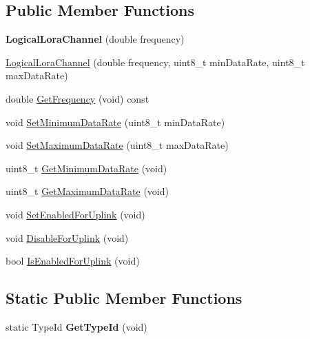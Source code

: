 \subsection*{Public Member Functions}
\begin{DoxyCompactItemize}
\item 
\mbox{\label{classns3_1_1lorawan_1_1LogicalLoraChannel_af4804eb74b0d9e6b12a9321172d9296f}} 
{\bfseries Logical\+Lora\+Channel} (double frequency)
\item 
\hyperlink{classns3_1_1lorawan_1_1LogicalLoraChannel_a686e1cf42931f1df4b1de55eadd3abbe}{Logical\+Lora\+Channel} (double frequency, uint8\+\_\+t min\+Data\+Rate, uint8\+\_\+t max\+Data\+Rate)
\item 
double \hyperlink{classns3_1_1lorawan_1_1LogicalLoraChannel_af77fc25d0cf3f6e951e2e9b34464fb28}{Get\+Frequency} (void) const
\item 
void \hyperlink{classns3_1_1lorawan_1_1LogicalLoraChannel_a6e1a26e63f6eea84231a22bf7e99702c}{Set\+Minimum\+Data\+Rate} (uint8\+\_\+t min\+Data\+Rate)
\item 
void \hyperlink{classns3_1_1lorawan_1_1LogicalLoraChannel_ab8c110f44d5937fa0d3facd544551e60}{Set\+Maximum\+Data\+Rate} (uint8\+\_\+t max\+Data\+Rate)
\item 
uint8\+\_\+t \hyperlink{classns3_1_1lorawan_1_1LogicalLoraChannel_a1d8a54566ba09ca217a37cd29c568d13}{Get\+Minimum\+Data\+Rate} (void)
\item 
uint8\+\_\+t \hyperlink{classns3_1_1lorawan_1_1LogicalLoraChannel_a1dd2658114ee12032c5f8a28407349d1}{Get\+Maximum\+Data\+Rate} (void)
\item 
void \hyperlink{classns3_1_1lorawan_1_1LogicalLoraChannel_a94bbcfed3cd6f5b0df26229c284861be}{Set\+Enabled\+For\+Uplink} (void)
\item 
void \hyperlink{classns3_1_1lorawan_1_1LogicalLoraChannel_ac1dd87336f77086462816ceebd787b6c}{Disable\+For\+Uplink} (void)
\item 
bool \hyperlink{classns3_1_1lorawan_1_1LogicalLoraChannel_a05fd7f9703aad2b8657612fca09db0b9}{Is\+Enabled\+For\+Uplink} (void)
\end{DoxyCompactItemize}
\subsection*{Static Public Member Functions}
\begin{DoxyCompactItemize}
\item 
\mbox{\label{classns3_1_1lorawan_1_1LogicalLoraChannel_affeafa2775461348be32c1670c65c005}} 
static Type\+Id {\bfseries Get\+Type\+Id} (void)
\end{DoxyCompactItemize}


